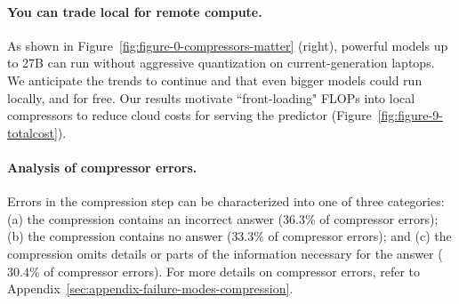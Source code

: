 \documentclass{article} %
\begin{document}
\paragraph*{You can trade local for remote compute.} 
As shown in Figure~\ref{fig:figure-0-compressors-matter} (right), powerful models up to 27B can run without aggressive quantization on current-generation laptops. We anticipate the trends to continue and that even bigger models could run locally, and for free. Our results motivate ``front-loading" FLOPs into local compressors to reduce cloud costs for serving the predictor (Figure~\ref{fig:figure-9-totalcost}).


\paragraph*{Analysis of compressor errors.} 
Errors in the compression step can be characterized into one of three categories: (a) the compression contains an incorrect answer ($36.3\%$ of compressor errors); (b) the compression contains no answer ($33.3\%$ of compressor errors); and (c) the compression omits details or parts of the information necessary for the answer ($30.4\%$ of compressor errors).
For more details on compressor errors, refer to Appendix~\ref{sec:appendix-failure-modes-compression}.
\end{document}
